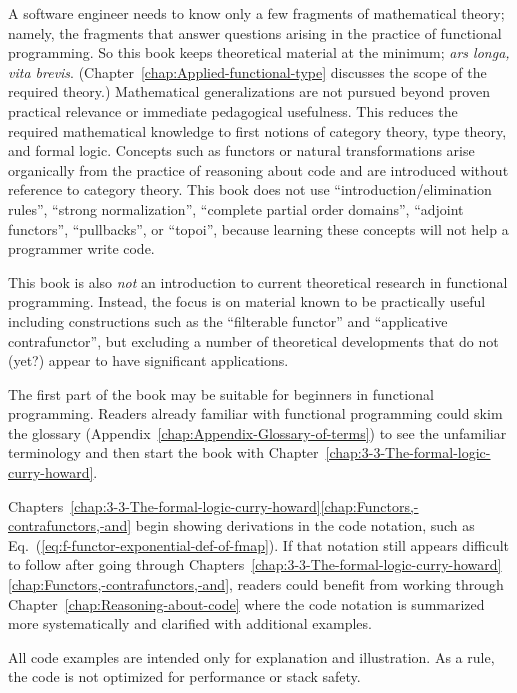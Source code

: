 A software engineer needs to know only a few fragments of mathematical
theory; namely, the fragments that answer questions arising in the
practice of functional programming. So this book keeps theoretical
material at the minimum; \emph{ars longa, vita brevis}. (Chapter~\ref{chap:Applied-functional-type}
discusses the scope of the required theory.) Mathematical generalizations
are not pursued beyond proven practical relevance or immediate pedagogical
usefulness. This reduces the required mathematical knowledge to first
notions of category theory, type theory, and formal logic. Concepts
such as functors or natural transformations arise organically from
the practice of reasoning about code and are introduced without reference
to category theory. This book does not use \textsf{``}introduction/elimination
rules\textsf{''}, \textsf{``}strong normalization\textsf{''}, \textsf{``}complete partial order domains\textsf{''},
\textsf{``}adjoint functors\textsf{''}, \textsf{``}pullbacks\textsf{''}, or \textsf{``}topoi\textsf{''}, because learning
these concepts will not help a programmer write code. 

This book is also \emph{not} an introduction to current theoretical
research in functional programming. Instead, the focus is on material
known to be practically useful \textemdash{} including constructions
such as the \textsf{``}filterable functor\textsf{''} and \textsf{``}applicative contrafunctor\textsf{''},
but excluding a number of theoretical developments that do not (yet?)
appear to have significant applications.

The first part of the book may be suitable for beginners in functional
programming. Readers already familiar with functional programming
could skim the glossary (Appendix~\ref{chap:Appendix-Glossary-of-terms})
to see the unfamiliar terminology and then start the book with Chapter~\ref{chap:3-3-The-formal-logic-curry-howard}.

Chapters~\ref{chap:3-3-The-formal-logic-curry-howard}\textendash \ref{chap:Functors,-contrafunctors,-and}
begin showing derivations in the code notation, such as Eq.~(\ref{eq:f-functor-exponential-def-of-fmap}).
If that notation still appears difficult to follow after going through
Chapters~\ref{chap:3-3-The-formal-logic-curry-howard}\textendash \ref{chap:Functors,-contrafunctors,-and},
readers could benefit from working through Chapter~\ref{chap:Reasoning-about-code}
where the code notation is summarized more systematically and clarified
with additional examples.

All code examples are intended only for explanation and illustration.
As a rule, the code is not optimized for performance or stack safety.

